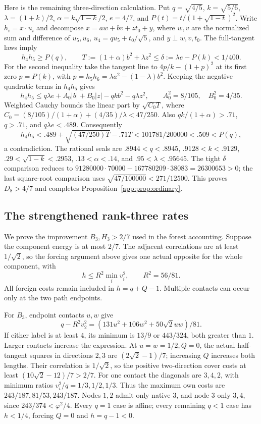 \documentclass[11pt]{article}
\theoremstyle{definition}
\theoremstyle{remark}
\begin{document}
Here is the remaining three-direction calculation. Put
$q=\sqrt{4/5}$, $k=\sqrt{5/6}$, $\lambda=(1+k)/2$,
$\alpha=k\sqrt{1-k}/2$, $e=4/7$, and
$P(t)=t/(1+\sqrt{1-t})^2$.
Write $h_i=x\cdot u_i$ and decompose
$x=aw+bv+zt_0+y$, where $w,v$ are the normalized sum and
difference of $u_5,u_6$, $u_4=qu_5+t_0/\sqrt5$, and
$y\perp w,v,t_0$. The full-tangent laws imply
\[
 h_4h_5\ge P(q),\qquad
 T:=(1+\alpha)b^2+\lambda z^2
 \le\delta:=\lambda e-P(k)<1/400.
\]
For the second inequality take the tangent line to
$4p/k-(1+p)^2$ at its first zero $p=P(k)$, with
$p=h_5h_6=\lambda a^2-(1-\lambda)b^2$.
Keeping the negative quadratic terms in $h_4h_5$ gives
\[
 h_4h_5\le q\lambda e+A_0|b|+B_0|z|
              -qkb^2-q\lambda z^2,\qquad
 A_0^2=8/105,\quad B_0^2=4/35.
\]
Weighted Cauchy bounds the linear part by $\sqrt{C_0T}$, where
$C_0=(8/105)/(1+\alpha)+(4/35)/\lambda<47/250$.
Also $qk/(1+\alpha)>.71$, $q>.71$, and $q\lambda e<.489$.
Consequently
\[
 h_4h_5<.489+\sqrt{(47/250)T}-.71T
 <101781/200000<.509<P(q),
\]
a contradiction. The rational seals are
$.8944<q<.8945$, $.9128<k<.9129$,
$.29<\sqrt{1-k}<.2953$, $.13<\alpha<.14$,
and $.95<\lambda<.95645$.
The tight $\delta$ comparison reduces to
$91280000\cdot70000-167780209\cdot38083=26300653>0$;
the last square-root comparison uses
$\sqrt{47/100000}<271/12500$.
This proves $D_8>4/7$ and completes Proposition~\ref{app:prop:ordinary}.

\subsection{The strengthened rank-three rates}
\label{app:strongrankthree}
We prove the improvement \(B_3,H_3>2/7\) used in the forest
accounting. Suppose the component energy is at most \(2/7\).
The adjacent correlations are at least \(1/\sqrt2\), so the
forcing argument above gives one actual opposite for the whole
component, with
\[
 h\leq R^2\min_i v_i^2,\qquad R^2=56/81.
\]
All foreign costs remain included in \(h=q+Q-1\).
Multiple contacts can occur only at the two path endpoints.

For \(B_3\), endpoint contacts \(u,w\) give
\[
 q-R^2v_2^2=(131u^2+106w^2+50\sqrt2uw)/81.
\]
If either label is at least \(4\), its minimum is \(13/9\)
or \(443/324\), both greater than \(1\). Larger contacts
increase the expression. At \(u=w=1/2,Q=0\), the actual
half-tangent squares in directions \(2,3\) are
\((2\sqrt2-1)/7\); increasing \(Q\) increases both lengths.
Their correlation is \(1/\sqrt2\), so the positive two-direction
cover costs at least \((10\sqrt2-12)/7>2/7\).
For one contact the diagonals are \(3,4,2\), with minimum
ratios \(v_i^2/q=1/3,1/2,1/3\). Thus the maximum own costs
are \(243/187,81/53,243/187\).
Nodes \(1,2\) admit only native \(3\), and node \(3\) only
\(3,4\), since \(243/374<\varphi^2/4\).
Every \(q=1\) case is affine; every remaining \(q<1\) case
has \(h<1/4\), forcing \(Q=0\) and \(h=q-1<0\).
\end{document}
